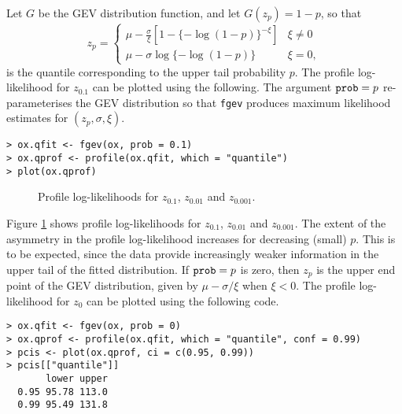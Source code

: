 \documentclass[11pt,a4paper]{article}
\begin{document}
Let $G$ be the GEV distribution function, and let $G(z_p) = 1-p$, so that
\begin{equation*}
z_p = 
\begin{cases}
\mu - \frac{\sigma}{\xi}[1 - \{-\log(1-p)\}^{-\xi}] & \xi \neq 0 \\
\mu - \sigma \log\{-\log(1-p)\} & \xi = 0,
\end{cases}
\end{equation*}
is the quantile corresponding to the upper tail probability $p$.
The profile log-likelihood for $z_{0.1}$ can be plotted using the following.
The argument $\verb+prob+ = p$ re-parameterises the GEV distribution so that \verb+fgev+ produces maximum likelihood estimates for $(z_p,\sigma,\xi)$. 
 
\begin{verbatim}
> ox.qfit <- fgev(ox, prob = 0.1)
> ox.qprof <- profile(ox.qfit, which = "quantile")
> plot(ox.qprof)
\end{verbatim}

\begin{figure}
\begin{center}
\vspace{-1.5cm}
\hspace{0cm}
\hspace{0cm}
\end{center} 
\caption{Profile log-likelihoods for $z_{0.1}$, $z_{0.01}$ and $z_{0.001}$.}
\label{quantprof}
\end{figure}

Figure \ref{quantprof} shows profile log-likelihoods for $z_{0.1}$, $z_{0.01}$ and $z_{0.001}$. 
The extent of the asymmetry in the profile log-likelihood increases for decreasing (small) $p$.
This is to be expected, since the data provide increasingly weaker information in the upper tail of the fitted distribution.
If $\verb+prob+ = p$ is zero, then $z_p$ is the upper end point of the GEV distribution, given by $\mu-\sigma/\xi$ when $\xi < 0$.
The profile log-likelihood for $z_0$ can be plotted using the following code.

\begin{verbatim}
> ox.qfit <- fgev(ox, prob = 0)
> ox.qprof <- profile(ox.qfit, which = "quantile", conf = 0.99)
> pcis <- plot(ox.qprof, ci = c(0.95, 0.99))
> pcis[["quantile"]]
       lower upper
  0.95 95.78 113.0
  0.99 95.49 131.8
\end{verbatim}
\end{document}
